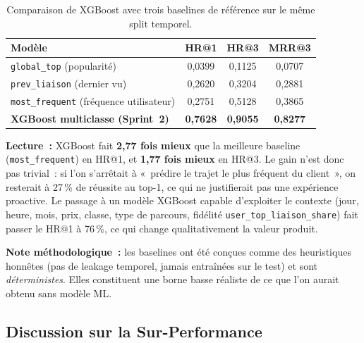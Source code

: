 \documentclass[11pt, a4paper]{article}
\begin{document}
\begin{table}[h]
\centering
\small
\begin{tabularx}{\textwidth}{|X|c|c|c|}
\hline
\textbf{Modèle}                       & \textbf{HR@1} & \textbf{HR@3} & \textbf{MRR@3} \\
\hline
\texttt{global\_top} (popularité)     & 0{,}0399      & 0{,}1125      & 0{,}0707 \\
\hline
\texttt{prev\_liaison} (dernier vu)   & 0{,}2620      & 0{,}3204      & 0{,}2881 \\
\hline
\texttt{most\_frequent} (fréquence utilisateur) & 0{,}2751 & 0{,}5128 & 0{,}3865 \\
\hline
\textbf{XGBoost multiclasse (Sprint~2)} & \textbf{0{,}7628} & \textbf{0{,}9055} & \textbf{0{,}8277} \\
\hline
\end{tabularx}
\caption{Comparaison de XGBoost avec trois baselines de référence
sur le même split temporel.}
\end{table}

\textbf{Lecture~:} XGBoost fait \textbf{2{,}77 fois mieux} que la meilleure
baseline (\texttt{most\_frequent}) en HR@1, et \textbf{1{,}77 fois mieux}
en HR@3. Le gain n'est donc pas trivial~: si l'on s'arrêtait à
«~prédire le trajet le plus fréquent du client~», on resterait à
27\,\% de réussite au top-1, ce qui ne justifierait pas une
expérience proactive. Le passage à un modèle XGBoost capable
d'exploiter le contexte (jour, heure, mois, prix, classe, type de
parcours, fidélité \texttt{user\_top\_liaison\_share}) fait passer le
HR@1 à 76\,\%, ce qui change qualitativement la valeur produit.

\textbf{Note méthodologique~:} les baselines ont été conçues comme
des heuristiques honnêtes (pas de leakage temporel, jamais
entraînées sur le test) et sont \textit{déterministes}. Elles
constituent une borne basse réaliste de ce que l'on aurait obtenu
sans modèle ML.

\subsection{Discussion sur la Sur-Performance}
\end{document}
